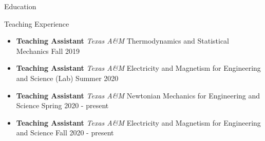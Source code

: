 \documentclass{resume}
\begin{document}
\begin{rSection}{Education}
\begin{rSection}{Teaching Experience}
    \begin{itemize}
        \item \textbf{Teaching Assistant} {{\it Texas A\&M} Thermodynamics and Statistical Mechanics} \hfill Fall 2019
        \item \textbf{Teaching Assistant} {{\it Texas A\&M} Electricity and Magnetism for Engineering and Science (Lab)} \hfill Summer 2020
        \item \textbf{Teaching Assistant} {{\it Texas A\&M} Newtonian Mechanics for Engineering and Science} \hfill Spring 2020 - present
        \item \textbf{Teaching Assistant} {{\it Texas A\&M} Electricity and Magnetism for Engineering and Science} \hfill Fall 2020 - present
    \end{itemize}
\end{rSection}


\end{rSection}

\end{document}
